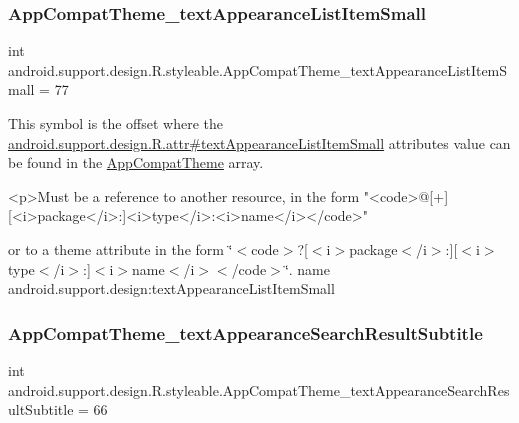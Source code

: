 \subsubsection{\texorpdfstring{App\+Compat\+Theme\+\_\+text\+Appearance\+List\+Item\+Small}{AppCompatTheme\_textAppearanceListItemSmall}}
{\footnotesize\ttfamily int android.\+support.\+design.\+R.\+styleable.\+App\+Compat\+Theme\+\_\+text\+Appearance\+List\+Item\+Small = 77\hspace{0.3cm}{\ttfamily [static]}}

This symbol is the offset where the \hyperlink{classandroid_1_1support_1_1design_1_1R_1_1attr_ab55f2b07d311017ec8b99a5a710c6a11}{android.\+support.\+design.\+R.\+attr\#text\+Appearance\+List\+Item\+Small} attribute\textquotesingle{}s value can be found in the \hyperlink{classandroid_1_1support_1_1design_1_1R_1_1styleable_afb351dc8de20cbd4c89abe360373010c}{App\+Compat\+Theme} array.

\begin{DoxyVerb}      <p>Must be a reference to another resource, in the form "<code>@[+][<i>package</i>:]<i>type</i>:<i>name</i></code>"
\end{DoxyVerb}
 or to a theme attribute in the form \char`\"{}$<$code$>$?\mbox{[}$<$i$>$package$<$/i$>$\+:\mbox{]}\mbox{[}$<$i$>$type$<$/i$>$\+:\mbox{]}$<$i$>$name$<$/i$>$$<$/code$>$\char`\"{}.  name android.\+support.\+design\+:text\+Appearance\+List\+Item\+Small \mbox{\label{classandroid_1_1support_1_1design_1_1R_1_1styleable_a5fb9efd1776571a8f6fb3e02b4b4602c}} 
\subsubsection{\texorpdfstring{App\+Compat\+Theme\+\_\+text\+Appearance\+Search\+Result\+Subtitle}{AppCompatTheme\_textAppearanceSearchResultSubtitle}}
{\footnotesize\ttfamily int android.\+support.\+design.\+R.\+styleable.\+App\+Compat\+Theme\+\_\+text\+Appearance\+Search\+Result\+Subtitle = 66\hspace{0.3cm}{\ttfamily [static]}}

